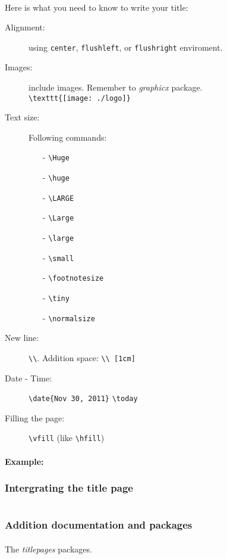 \paragraph{}
Here is what you need to know to write your title:
\begin{description}
	\item[Alignment:] using \texttt{center}, \texttt{flushleft}, or \texttt{flushright} enviroment.
	\item[Images:] include images. Remember to \emph{graphicx} package. \hfill \\
		\verb|\texttt{[image: ./logo]}|
	\item[Text size:] Following commands: 
		\begin{itemize}
			\item[-] \verb|\Huge|
			\item[-] \verb|\huge|
			\item[-] \verb|\LARGE|
			\item[-] \verb|\Large|
			\item[-] \verb|\large|
			\item[-] \verb|\small|
			\item[-] \verb|\footnotesize|
			\item[-] \verb|\tiny|
			\item[-] \verb|\normalsize|
		\end{itemize}
	\item[New line:] \verb|\\|. Addition space: \verb|\\ [1cm]|
	\item[Date - Time:] \verb|\date{Nov 30, 2011}| \verb|\today|
	\item[Filling the page:] \verb|\vfill| (like \verb|\hfill|)
\end{description}

\paragraph{Example:}


\subsubsection{Intergrating the title page}
\begin{verbatim}

\end{verbatim}
\subsubsection{Addition documentation and packages}

\paragraph{}
The \emph{titlepages} packages.
